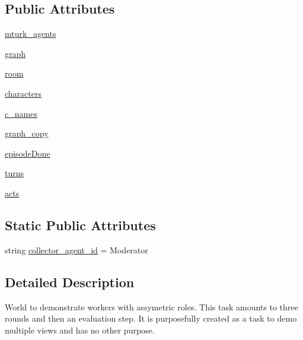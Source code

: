 \subsection*{Public Attributes}
\begin{DoxyCompactItemize}
\item 
\hyperlink{classlight__chats_1_1worlds_1_1LightChatTaskWorld_a03c483980d5fccf72cfa649cd03c2f77}{mturk\+\_\+agents}
\item 
\hyperlink{classlight__chats_1_1worlds_1_1LightChatTaskWorld_aded32ffc23a823ecc788982d2748fd18}{graph}
\item 
\hyperlink{classlight__chats_1_1worlds_1_1LightChatTaskWorld_a64f0056e716241b9baf5347bf6aa8b62}{room}
\item 
\hyperlink{classlight__chats_1_1worlds_1_1LightChatTaskWorld_a5da5f77b33e3893c9f699b809de9d451}{characters}
\item 
\hyperlink{classlight__chats_1_1worlds_1_1LightChatTaskWorld_ac0cf8e94d06f13b16c56ba58fbc2cf16}{c\+\_\+names}
\item 
\hyperlink{classlight__chats_1_1worlds_1_1LightChatTaskWorld_a48f8db77c1ddde1d617b8f14bfe7eef8}{graph\+\_\+copy}
\item 
\hyperlink{classlight__chats_1_1worlds_1_1LightChatTaskWorld_a9123e29fdef98b5ca9cb3b44a15c147c}{episode\+Done}
\item 
\hyperlink{classlight__chats_1_1worlds_1_1LightChatTaskWorld_aed1a391087a81f6a87105fcf4d769296}{turns}
\item 
\hyperlink{classlight__chats_1_1worlds_1_1LightChatTaskWorld_a2b2a14119080a436033495c597b6bbbf}{acts}
\end{DoxyCompactItemize}
\subsection*{Static Public Attributes}
\begin{DoxyCompactItemize}
\item 
string \hyperlink{classlight__chats_1_1worlds_1_1LightChatTaskWorld_a2ae0c46f201df8e855e675085734c10c}{collector\+\_\+agent\+\_\+id} = \textquotesingle{}Moderator\textquotesingle{}
\end{DoxyCompactItemize}


\subsection{Detailed Description}
\begin{DoxyVerb}World to demonstrate workers with assymetric roles. This task amounts
to three rounds and then an evaluation step. It is purposefully created
as a task to demo multiple views and has no other purpose.
\end{DoxyVerb}
 

